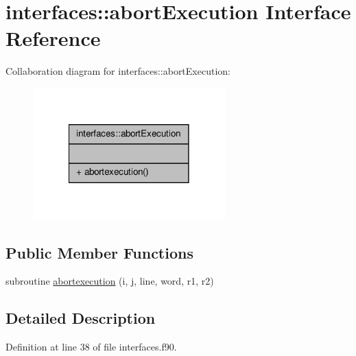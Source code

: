 \hypertarget{interfaceinterfaces_1_1abort_execution}{\section{interfaces\-:\-:abort\-Execution Interface Reference}
\label{interfaceinterfaces_1_1abort_execution}
}


Collaboration diagram for interfaces\-:\-:abort\-Execution\-:\nopagebreak
\begin{figure}[H]
\begin{center}
\leavevmode
\includegraphics[width=210pt]{interfaceinterfaces_1_1abort_execution__coll__graph}
\end{center}
\end{figure}
\subsection*{Public Member Functions}
\begin{DoxyCompactItemize}
\item 
subroutine \hyperlink{interfaceinterfaces_1_1abort_execution_a8af77035559d5f1eee0e3b9c3843a08d}{abortexecution} (i, j, line, word, r1, r2)
\end{DoxyCompactItemize}


\subsection{Detailed Description}


Definition at line 38 of file interfaces.\-f90.



